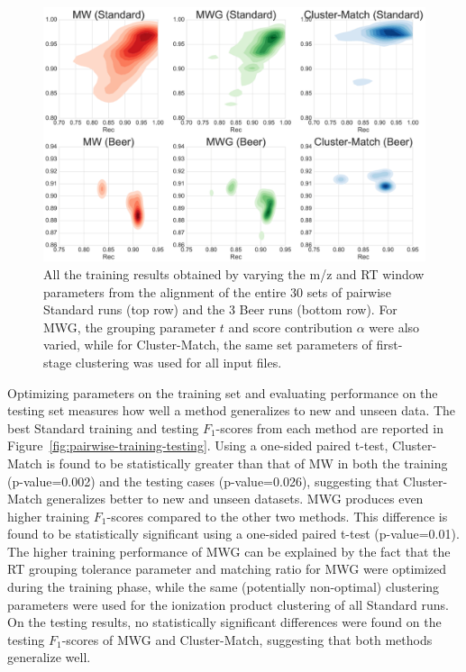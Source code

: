\begin{figure}[!htbp]
\centering
\centering\includegraphics[width=1.0\linewidth]{05-precursor-cluster/figures/fig2.pdf}
\caption[All the training results obtained by varying the m/z and RT window parameters from the alignment of the entire 30 sets of pairwise Standard runs (top row) and the 3 Beer runs (bottom row).]{\label{fig:training-results} All the training results obtained by varying the m/z and RT window parameters from the alignment of the entire 30 sets of pairwise Standard runs (top row) and the 3 Beer runs (bottom row). For MWG, the grouping parameter $t$ and score contribution $\alpha$ were also varied, while for Cluster-Match, the same set parameters of first-stage clustering was used for all input files.}
\end{figure}

Optimizing parameters on the training set and evaluating performance on the testing set measures how well a method generalizes to new and unseen data. The best Standard training and testing $F_1$-scores from each method are reported in Figure~\ref{fig:pairwise-training-testing}. Using a one-sided paired t-test, Cluster-Match is found to be statistically greater than that of MW in both the training (p-value=0.002) and the testing cases (p-value=0.026), suggesting that Cluster-Match generalizes better to new and unseen datasets. MWG produces even higher training $F_1$-scores compared to the other two methods. This difference is found to be statistically significant using a one-sided paired t-test (p-value=0.01). The higher training performance of MWG can be explained by the fact that the RT grouping tolerance parameter and matching ratio for MWG were optimized during the training phase, while the same (potentially non-optimal) clustering parameters were used for the ionization product clustering of all Standard runs. On the testing results, no statistically significant differences were found on the testing $F_1$-scores of MWG and Cluster-Match, suggesting that both methods generalize well. 

